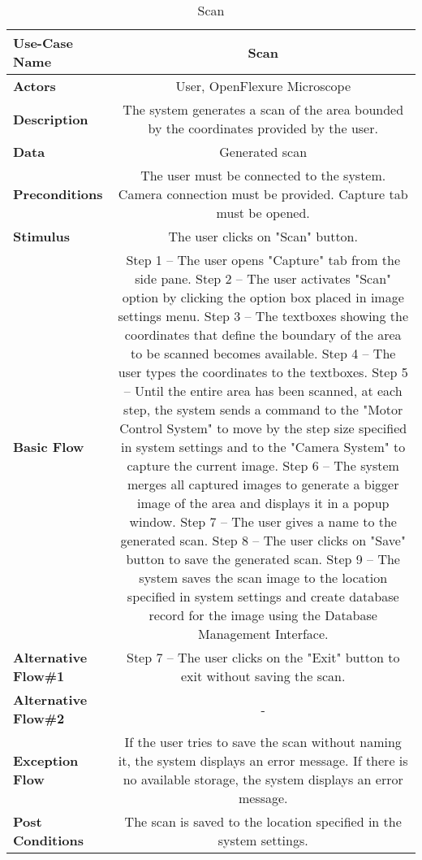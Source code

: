 \begin{table}[H]
	\centering
	\begin{tabular}{|l|C|}
		\hline
		\textbf{Use-Case Name} & Scan \\
		\hline
		\textbf{Actors} & User, OpenFlexure Microscope \\ 
		\hline
		\textbf{Description} & The system generates a scan of the area bounded by the coordinates provided by the user.\\ 
		\hline
		\textbf{Data} & Generated scan\\ 
		\hline
		\textbf{Preconditions} & 
		The user must be connected to the system. \newline
		Camera connection must be provided. \newline
		Capture tab must be opened. \\ 
		\hline
		\textbf{Stimulus} & The user clicks on "Scan" button.\\ 
		\hline
		\textbf{Basic Flow} & 
		Step 1 -- The user opens "Capture" tab from the side pane. \newline
		Step 2 -- The user activates "Scan" option by clicking the option box placed in image settings menu. \newline
		Step 3 -- The textboxes showing the coordinates that define the boundary of the area to be scanned becomes available. \newline
		Step 4 -- The user types the coordinates to the textboxes. \newline
		Step 5 -- Until the entire area has been scanned, at each step, the system sends a command to the "Motor Control System" to move by the step size specified in system settings and to the "Camera System" to capture the current image. \newline
		Step 6 -- The system merges all captured images to generate a bigger image of the area and displays it in a popup window. \newline
        Step 7 -- The user gives a name to the generated scan. \newline
		Step 8 -- The user clicks on "Save" button to save the generated scan. \newline
		Step 9 -- The system saves the scan image to the location specified in system settings and create database record for the image using the Database Management Interface. \\
		\hline
		\textbf{Alternative Flow\#1} & 
		Step 7 -- The user clicks on the "Exit" button to exit without saving the scan. \\
		\hline
		\textbf{Alternative Flow\#2} & - \\
		\hline
		\textbf{Exception Flow} & If the user tries to save the scan without naming it, the system displays an error message. If there is no available storage, the system displays an error message.\\
		\hline
		\textbf{Post Conditions} & The scan is saved to the location specified in the system settings. \\ 
		\hline
	\end{tabular}
	\caption{Scan}
	\label{tab:scan}
\end{table}